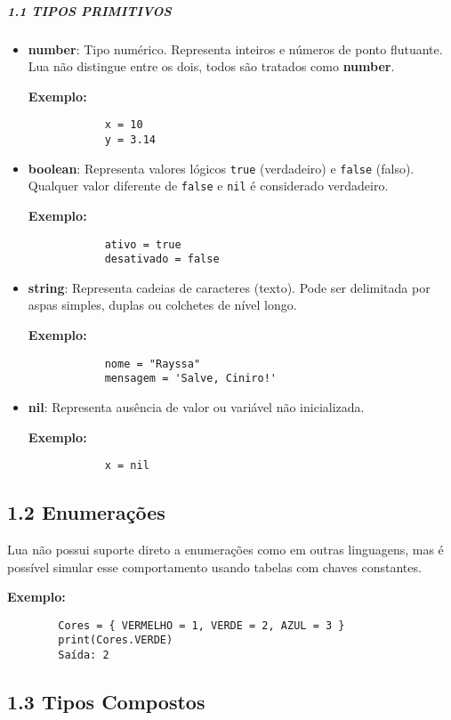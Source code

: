 \documentclass[12pt,a4paper]{article}
\begin{document}
	
	\subparagraph{1.1 TIPOS PRIMITIVOS}
	\begin{itemize}
		\item \textbf{number}: Tipo numérico. Representa inteiros e números de ponto flutuante. Lua não distingue entre os dois, todos são tratados como \textbf{number}.
		
		\textbf{Exemplo:}
		\begin{verbatim}
			x = 10
			y = 3.14
		\end{verbatim}
		
		\item \textbf{boolean}: Representa valores lógicos \texttt{true} (verdadeiro) e \texttt{false} (falso). Qualquer valor diferente de \texttt{false} e \texttt{nil} é considerado verdadeiro.
		
		\textbf{Exemplo:}
		\begin{verbatim}
			ativo = true
			desativado = false
		\end{verbatim}
		
		\item \textbf{string}: Representa cadeias de caracteres (texto). Pode ser delimitada por aspas simples, duplas ou colchetes de nível longo.
		
		\textbf{Exemplo:}
		\begin{verbatim}
			nome = "Rayssa"
			mensagem = 'Salve, Ciniro!'
		\end{verbatim}
		
		\item \textbf{nil}: Representa ausência de valor ou variável não inicializada.
		
		\textbf{Exemplo:}
		\begin{verbatim}
			x = nil
		\end{verbatim}
	\end{itemize}
	
	\subsection*{1.2 Enumerações}
	
	Lua não possui suporte direto a enumerações como em outras linguagens, mas é possível simular esse comportamento usando tabelas com chaves constantes.
	
	\textbf{Exemplo:}
	\begin{verbatim}
		Cores = { VERMELHO = 1, VERDE = 2, AZUL = 3 }
		print(Cores.VERDE)
		Saída: 2
	\end{verbatim}
	
	\subsection*{1.3 Tipos Compostos}
	
\end{document}

